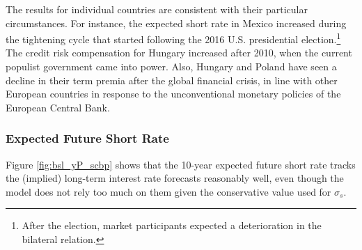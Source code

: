 {The results for individual countries are consistent with their particular circumstances.
For instance, the expected short rate in Mexico increased during the tightening cycle that started %
following the 2016 U.S. presidential election.\footnote{ After the election, market participants expected a deterioration in the bilateral relation.}
The credit risk compensation for Hungary increased after 2010, when the current populist government came into power. 
Also, Hungary and Poland have seen a decline in their term premia after the global financial crisis, in line with other European countries in response to the unconventional monetary policies of the European Central Bank.

\subsubsection{Expected Future Short Rate}
\iftoggle{toclinks}{\gototoc}{} %

Figure \ref{fig:bsl_yP_scbp} shows that the 10-year expected future short rate tracks the (implied) long-term interest rate forecasts reasonably well, even though the model does not rely too much on them given the conservative value used for \(\sigma_s\).

%	


}
